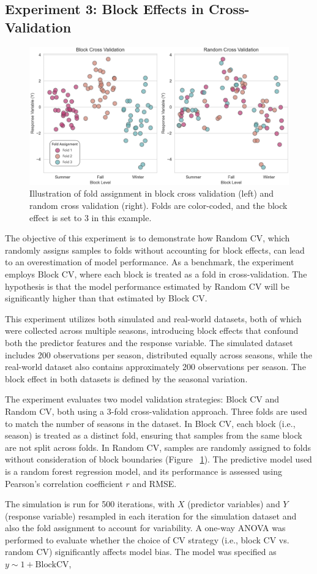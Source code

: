 \subsection{Experiment 3: Block Effects in Cross-Validation}

\begin{figure}[H]
    \centering
    \includegraphics[width=.8\textwidth]{fig_s3_block.jpg}
    \caption{Illustration of fold assignment in block cross validation (left) and random cross validation (right). Folds are color-coded, and the block effect is set to 3 in this example.}
    \label{fig:s3_block}
\end{figure}

The objective of this experiment is to demonstrate how Random CV, which randomly assigns samples to folds without accounting for block effects, can lead to an overestimation of model performance. As a benchmark, the experiment employs Block CV, where each block is treated as a fold in cross-validation. The hypothesis is that the model performance estimated by Random CV will be significantly higher than that estimated by Block CV.

This experiment utilizes both simulated and real-world datasets, both of which were collected across multiple seasons, introducing block effects that confound both the predictor features and the response variable. The simulated dataset includes 200 observations per season, distributed equally across seasons, while the real-world dataset also contains approximately 200 observations per season. The block effect in both datasets is defined by the seasonal variation.

The experiment evaluates two model validation strategies: Block CV and Random CV, both using a 3-fold cross-validation approach. Three folds are used to match the number of seasons in the dataset. In Block CV, each block (i.e., season) is treated as a distinct fold, ensuring that samples from the same block are not split across folds. In Random CV, samples are randomly assigned to folds without consideration of block boundaries (Figure ~\ref{fig:s3_block}). The predictive model used is a random forest regression model, and its performance is assessed using Pearson’s correlation coefficient $r$ and RMSE.

The simulation is run for 500 iterations, with $X$ (predictor variables) and $Y$ (response variable) resampled in each iteration for the simulation dataset and also the fold assignment to account for variability. A one-way ANOVA was performed to evaluate whether the choice of CV strategy (i.e., block CV vs. random CV) significantly affects model bias. The model was specified as $y \sim 1 + \text{BlockCV}$,
